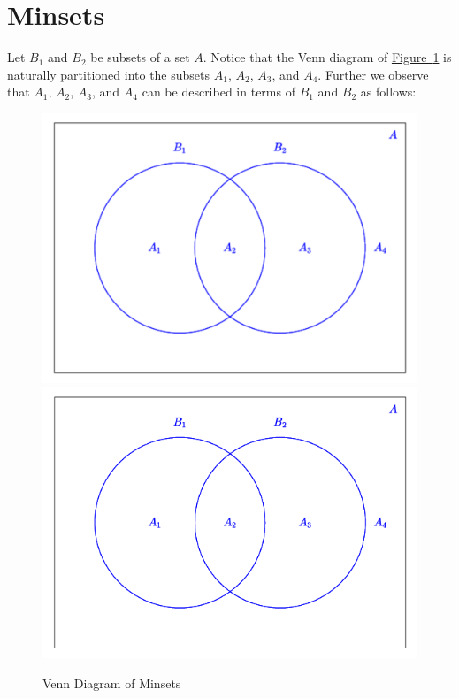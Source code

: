 \documentclass[10pt,]{book}
\theoremstyle{plain}
\theoremstyle{definition}
\theoremstyle{definition}
\theoremstyle{definition}
\begin{document}
\section[Minsets]{Minsets}\label{s-minsets}
Let \(B_1\) and \(B_2\) be subsets of a set \(A\). Notice that the Venn diagram of \hyperref[fig-minsets-2]{Figure~\ref{fig-minsets-2}} is naturally partitioned into the subsets \(A_1\), \(A_2\), \(A_3\), and \(A_4\). Further we observe that \(A_1\), \(A_2\), \(A_3\), and \(A_4\) can be described in terms of \(B_1\) and \(B_2\) as follows:%
\leavevmode%
\begin{figure}
\centering
{}%
{\includegraphics[width=1\linewidth]{images/minsets-2.pdf}}%
{\includegraphics[width=1\linewidth]{images/minsets-2.png}}
\caption{Venn Diagram of Minsets\label{fig-minsets-2}}
\end{figure}
\end{document}
